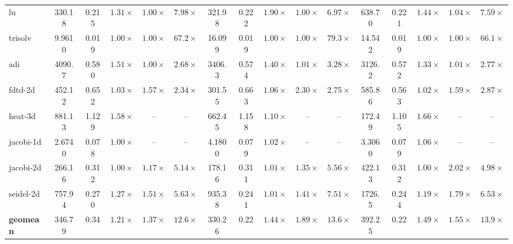 \documentclass[acmsmall,review,anonymous,screen]{acmart}
\begin{document}
\begin{table}[tbp]
{\begin{tabular}{lccccccccccccccc}
lu & 330.18 & 0.215 & \(1.31\times\) & \(1.00\times\) & \(7.98\times\) & 321.98 & 0.222 & \(1.90\times\) & \(1.00\times\) & \(6.97\times\) & 638.70 & 0.221 & \(1.44\times\) & \(1.04\times\) & \(7.59\times\) \\
trisolv & 9.9610 & 0.019 & \(1.00\times\) & \(1.00\times\) & \(67.2\times\) & 16.099 & 0.019 & \(1.00\times\) & \(1.00\times\) & \(79.3\times\) & 14.542 & 0.019 & \(1.00\times\) & \(1.00\times\) & \(66.1\times\) \\
adi & 4090.7 & 0.580 & \(1.51\times\) & \(1.00\times\) & \(2.68\times\) & 3406.3 & 0.574 & \(1.40\times\) & \(1.01\times\) & \(3.28\times\) & 3126.2 & 0.572 & \(1.33\times\) & \(1.01\times\) & \(2.77\times\) \\
fdtd-2d & 452.12 & 0.652 & \(1.03\times\) & \(1.57\times\) & \(2.34\times\) & 301.55 & 0.663 & \(1.06\times\) & \(2.30\times\) & \(2.75\times\) & 585.86 & 0.563 & \(1.02\times\) & \(1.59\times\) & \(2.87\times\) \\
heat-3d & 881.13 & 1.129 & \(1.58\times\) & -- & -- & 662.45 & 1.158 & \(1.10\times\) & -- & -- & 172.49 & 1.105 & \(1.66\times\) & -- & -- \\
jacobi-1d & 2.6740 & 0.078 & \(1.00\times\) & -- & -- & 4.1800 & 0.079 & \(1.02\times\) & -- & -- & 3.3060 & 0.079 & \(1.06\times\) & -- & -- \\
jacobi-2d & 266.16 & 0.312 & \(1.00\times\) & \(1.17\times\) & \(5.14\times\) & 178.16 & 0.311 & \(1.01\times\) & \(1.35\times\) & \(5.56\times\) & 422.13 & 0.312 & \(1.00\times\) & \(2.02\times\) & \(4.98\times\) \\
seidel-2d & 757.94 & 0.270 & \(1.27\times\) & \(1.51\times\) & \(5.63\times\) & 935.38 & 0.241 & \(1.01\times\) & \(1.41\times\) & \(7.51\times\) & 1726.5 & 0.244 & \(1.19\times\) & \(1.79\times\) & \(6.53\times\) \\
\midrule
\textbf{geomean} & 346.79 & 0.34 & \(\mathbf{1.21\times}\) & \(\mathbf{1.37\times}\) & \(\mathbf{12.6\times}\) & 330.26 & 0.22 & \(\mathbf{1.44\times}\) & \(\mathbf{1.89\times}\) & \(\mathbf{13.6\times}\) & 392.25 & 0.22 & \(\mathbf{1.49\times}\) & \(\mathbf{1.55\times}\) & \(\mathbf{13.9\times}\) \\
\bottomrule
\end{tabular}
}
\end{table}
\end{document}
